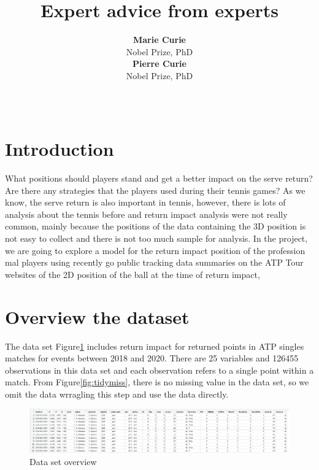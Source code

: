 \documentclass[11pt,a4paper,]{article}
\title{Expert advice from experts}
\author{\sf\Large\textbf{ Marie Curie}\\ {\sf\large Nobel Prize, PhD\\[0.5cm]} \sf\Large\textbf{ Pierre Curie}\\ {\sf\large Nobel Prize, PhD\\[0.5cm]}}
\date{\sf\Date~\Month~\Year}
\makeatletter
\def\titlepage{\front{\expandafter{\@title}}{\@author}{\@organization}}
\makeatother
\begin{document}
\titlepage

\clearpage

\hypertarget{introduction}{%
\section{Introduction}\label{introduction}}

What positions should players stand and get a better impact on the serve return? Are there any strategies that the players used during their tennis games? As we know, the serve return is also important in tennis, however, there is lots of analysis about the tennis before and return impact analysis were not really common, mainly because the positions of the data containing the 3D position is not easy to collect and there is not too much sample for analysis. In the project, we are going to explore a model for the return impact position of the profession mal players using recently go public tracking data summaries on the ATP Tour websites of the 2D position of the ball at the time of return impact,

\hypertarget{overview-the-dataset}{%
\section{Overview the dataset}\label{overview-the-dataset}}

The data set Figure\ref{fig:datset} includes return impact for returned points in ATP singles matches for events between 2018 and 2020. There are 25 variables and 126455 observations in this data set and each observation refers to a single point within a match. From Figure\ref{fig:tidymiss}, there is no missing value in the data set, so we omit the data wrragling this step and use the data directly.

\begin{figure}
\includegraphics[width=1\linewidth]{image/dataset} \caption{Data set overview}\label{fig:datset}
\end{figure}
\end{document}
